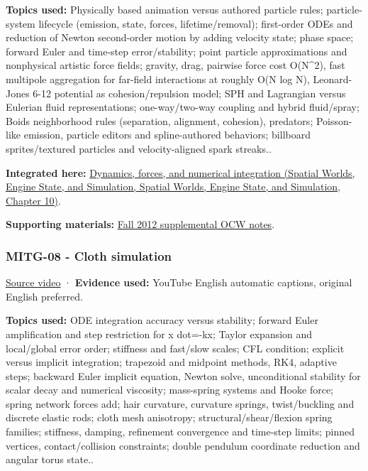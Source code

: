 \textbf{Topics used:} Physically based animation versus authored particle rules; particle-system lifecycle (emission, state, forces, lifetime/removal); first-order ODEs and reduction of Newton second-order motion by adding velocity state; phase space; forward Euler and time-step error/stability; point particle approximations and nonphysical artistic force fields; gravity, drag, pairwise force cost O(N\^{}2), fast multipole aggregation for far-field interactions at roughly O(N log N), Leonard-Jones 6-12 potential as cohesion/repulsion model; SPH and Lagrangian versus Eulerian fluid representations; one-way/two-way coupling and hybrid fluid/spray; Boids neighborhood rules (separation, alignment, cohesion), predators; Poisson-like emission, particle editors and spline-authored behaviors; billboard sprites/textured particles and velocity-aligned spark streaks..

\textbf{Integrated here:} \href{../05-Spatial-Worlds-Engine-State-and-Simulation/main.pdf\#nameddest=04-visual-computing-ii-ch029-dynamics-forces-and-numerical-integration}{Dynamics, forces, and numerical integration (Spatial Worlds, Engine State, and Simulation, Spatial Worlds, Engine State, and Simulation, Chapter 10)}.

\textbf{Supporting materials:} \href{https://ocw.mit.edu/courses/6-837-computer-graphics-fall-2012/pages/lecture-notes/}{Fall 2012 supplemental OCW notes}.

\subsubsection{MITG-08 - Cloth simulation}\label{04-visual-computing-ii-ch036-mitg-08---cloth-simulation}

\href{https://www.youtube.com/watch?v=PJ8VzufNZ8o}{Source video} · \textbf{Evidence used:} YouTube English automatic captions, original English preferred.

\textbf{Topics used:} ODE integration accuracy versus stability; forward Euler amplification and step restriction for x dot=-kx; Taylor expansion and local/global error order; stiffness and fast/slow scales; CFL condition; explicit versus implicit integration; trapezoid and midpoint methods, RK4, adaptive steps; backward Euler implicit equation, Newton solve, unconditional stability for scalar decay and numerical viscosity; mass-spring systems and Hooke force; spring network forces add; hair curvature, curvature springs, twist/buckling and discrete elastic rods; cloth mesh anisotropy; structural/shear/flexion spring families; stiffness, damping, refinement convergence and time-step limits; pinned vertices, contact/collision constraints; double pendulum coordinate reduction and angular torus state..

